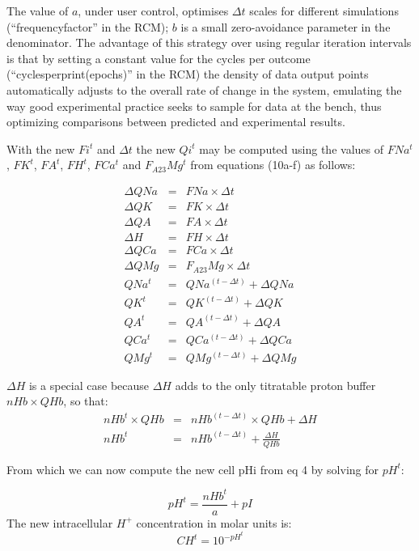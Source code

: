 \documentclass[a4paper]{article}
\newcommand{\F}[2]{F_{#1}#2}
\begin{document}
The value of $a$, under user control, optimises $\Delta t$ scales for different simulations (“frequencyfactor” in the RCM); $b$ is a small zero-avoidance parameter in the denominator. The advantage of this strategy over using regular iteration intervals is that by setting a constant value for the cycles per outcome (“cyclesperprint(epochs)” in the RCM) the density of data output points automatically adjusts to the overall rate of change in the system, emulating the way good experimental practice seeks to sample for data at the bench, thus optimizing comparisons between predicted and experimental results.    

With the new $Fi^t$ and $\Delta t$ the new $Qi^t$ may be computed using the values of $FNa^t$, $FK^t$, $FA^t$, $FH^t$, $FCa^t$ and $\F{A23}{Mg}^t$ from equations (10a-f) as follows:

\setcounter{equation}{0}
\renewcommand{\theequation}{20\alph{equation}}

\begin{eqnarray}
\Delta QNa &=& FNa\times\Delta t\\
\Delta QK &=& FK\times\Delta t \\
\Delta QA &=& FA\times\Delta t \\
\Delta H &=& FH\times\Delta t \\
\Delta QCa &=& FCa\times\Delta t \\
\Delta QMg &=& \F{A23}{Mg}\times\Delta t \\
QNa^t &=& QNa^{(t-\Delta t)} + \Delta QNa \\
QK^t &=& QK^{(t-\Delta t)} + \Delta QK  \\
QA^t &=& QA^{(t-\Delta t)} + \Delta QA  \\
QCa^t &=& QCa^{(t-\Delta t)} + \Delta QCa  \\
QMg^t &=& QMg^{(t-\Delta t)} + \Delta QMg
\end{eqnarray}

$\Delta H$ is a special case because $\Delta H$ adds to the only titratable proton buffer $nHb\times QHb$, so that:
\setcounter{equation}{0}
\renewcommand{\theequation}{21\alph{equation}}
\begin{eqnarray}
nHb^t\times QHb &=& nHb^{(t-\Delta t)}\times QHb + \Delta H \\
nHb^t &=& nHb^{(t-\Delta t)}  + \frac{\Delta H}{QHb}
\end{eqnarray}

From which we can now compute the new cell pHi from eq 4 by solving for $pH^t$:

\begin{equation}
pH^t = \frac{nHb^t}{a} + pI
\end{equation}
The new intracellular $H^+$ concentration in molar units is:
\begin{equation}
CH^t = 10^{-pH^t}
\end{equation}
\end{document}
